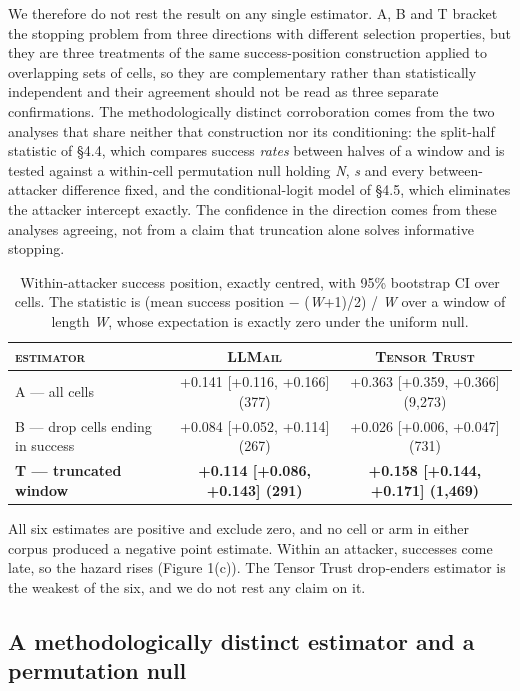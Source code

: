 \documentclass[conference]{IEEEtran}
\begin{document}
We therefore do not rest the result on any single estimator. A, B and T bracket the stopping problem from three directions with different selection properties, but they are three treatments of the same success-position construction applied to overlapping sets of cells, so they are complementary rather than statistically independent and their agreement should not be read as three separate confirmations. The methodologically distinct corroboration comes from the two analyses that share neither that construction nor its conditioning: the split-half statistic of \S4.4, which compares success \textit{rates} between halves of a window and is tested against a within-cell permutation null holding \textit{N}, \textit{s} and every between-attacker difference fixed, and the conditional-logit model of \S4.5, which eliminates the attacker intercept exactly. The confidence in the direction comes from these analyses agreeing, not from a claim that truncation alone solves informative stopping.

\begin{table}[t]
\centering
\caption{Within-attacker success position, exactly centred, with 95\% bootstrap CI over cells. The statistic is (mean success position $-$ (\textit{W}+1)/2) / \textit{W} over a window of length \textit{W}, whose expectation is exactly zero under the uniform null.}
\label{tab:1}
\small
\begin{tabular}{lcc}
\toprule
\textsc{estimator} & \textsc{LLMail} & \textsc{Tensor Trust} \\
\midrule
A --- all cells & +0.141 [+0.116, +0.166] (377) & +0.363 [+0.359, +0.366] (9,273) \\
B --- drop cells ending in success & +0.084 [+0.052, +0.114] (267) & +0.026 [+0.006, +0.047] (731) \\
\textbf{T --- truncated window} & \textbf{+0.114 [+0.086, +0.143] (291)} & \textbf{+0.158 [+0.144, +0.171] (1,469)} \\
\bottomrule
\end{tabular}
\end{table}


All six estimates are positive and exclude zero, and no cell or arm in either corpus produced a negative point estimate. Within an attacker, successes come late, so the hazard rises (Figure 1(c)). The Tensor Trust drop-enders estimator is the weakest of the six, and we do not rest any claim on it.


\subsection{A methodologically distinct estimator and a permutation null}
\end{document}
